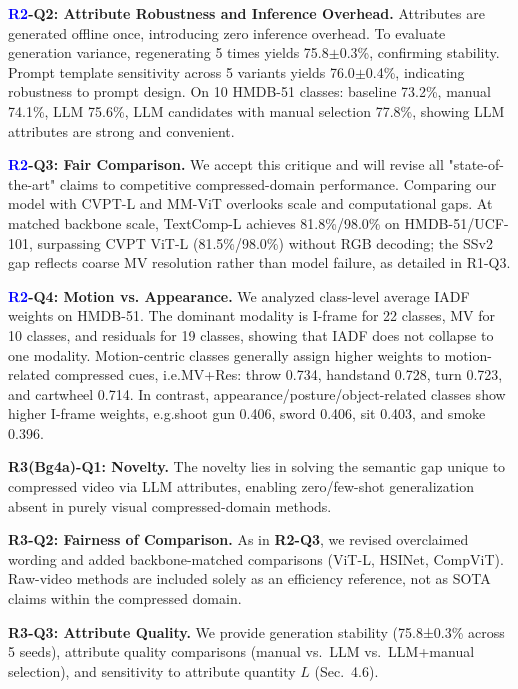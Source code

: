\documentclass[10pt,twocolumn,letterpaper]{article}
\begin{document}
\noindent\textbf{\textcolor{blue}{R2}-Q2: Attribute Robustness and Inference Overhead.} Attributes are generated offline once, introducing zero inference overhead. To evaluate generation variance, regenerating 5 times yields 75.8$\pm$0.3\%, confirming stability. Prompt template sensitivity across 5 variants yields 76.0$\pm$0.4\%, indicating robustness to prompt design. On 10 HMDB-51 classes: baseline 73.2\%, manual 74.1\%, LLM 75.6\%, LLM candidates with manual selection 77.8\%, showing LLM attributes are strong and convenient.

\noindent\textbf{\textcolor{blue}{R2}-Q3: Fair Comparison.} We accept this critique and will revise all "state-of-the-art" claims to competitive compressed-domain performance. Comparing our model with CVPT-L and MM-ViT overlooks scale and computational gaps. At matched backbone scale, TextComp-L achieves 81.8\%/98.0\% on HMDB-51/UCF-101, surpassing CVPT ViT-L (81.5\%/98.0\%) without RGB decoding; the SSv2 gap reflects coarse MV resolution rather   than model failure, as detailed in R1-Q3.


\noindent\textbf{\textcolor{blue}{R2}-Q4: Motion vs. Appearance.} We analyzed class-level average IADF weights on HMDB-51. The dominant modality is I-frame for 22 classes, MV for 10 classes, and residuals for 19 classes, showing that IADF does not collapse to one modality. Motion-centric classes generally assign higher weights to motion-related compressed cues, i.e.MV+Res: throw 0.734, handstand 0.728, turn 0.723, and cartwheel 0.714. In contrast, appearance/posture/object-related classes show higher I-frame weights, e.g.shoot gun 0.406, sword 0.406, sit 0.403, and smoke 0.396.

\noindent\textbf{\textcolor{green!55!black}{R3(Bg4a)}-Q1: Novelty.} The novelty lies in solving the semantic gap unique to compressed video via LLM attributes, enabling zero/few-shot generalization absent in purely visual compressed-domain methods.

\noindent\textbf{\textcolor{green!55!black}{R3}-Q2: Fairness of Comparison.} As in \textbf{R2-Q3}, we revised overclaimed wording and added backbone-matched comparisons (ViT-L, HSINet, CompViT). Raw-video methods are included solely as an efficiency reference, not as SOTA claims within the compressed domain.

\noindent\textbf{\textcolor{green!55!black}{R3}-Q3: Attribute Quality.} We provide generation stability (75.8±0.3\% across 5 seeds), attribute quality comparisons (manual vs.\ LLM vs.\ LLM+manual selection), and sensitivity to attribute quantity $L$ (Sec.~4.6).
\end{document}
